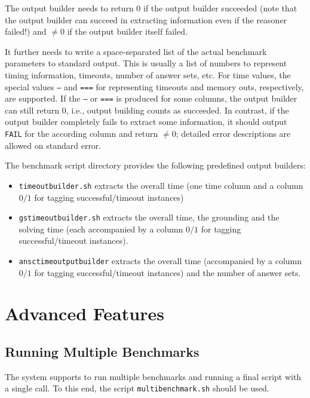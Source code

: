 \documentclass[a4paper]{article}
\begin{document}
		The output builder needs to return $0$ if the output builder succeeded (note that the output builder can succeed in extracting information even if the reasoner failed!)
		and $\not=0$ if the output builder itself failed.
		
		It further needs to write a space-separated list of the actual benchmark parameters to standard output.
		This is usually a list of numbers to represent timing information, timeouts, number of answer sets, etc. For time values,
		the special values {\tt ---} and {\tt ===} for representing timeouts and memory outs, respectively, are supported.
		If the {\tt ---} or {\tt ===} is produced for some columns, the output builder can still return $0$, i.e.,
		output building counts as succeeded.
		In contrast, if the output builder completely fails to extract some information, it should output {\tt FAIL} for the according column
		and return $\not=0$; detailed error descriptions are allowed on standard error.
		
		The benchmark script directory provides the following predefined output builders:
				
		\begin{itemize}
		    \item {\tt timeoutbuilder.sh} extracts the overall time (one time column and a column $0/1$ for tagging successful/timeout instances)
		    \item {\tt gstimeoutbuilder.sh} extracts the overall time, the grounding and the solving time (each accompanied by a column $0/1$ for tagging successful/timeout instances).
		    \item {\tt ansctimeoutputbuilder} extracts the overall time (accompanied by a column $0/1$ for tagging successful/timeout instances) and the number of answer sets.
		\end{itemize}
			
	\section{Advanced Features}
	\label{sec:advanced}
			
		\subsection{Running Multiple Benchmarks}
		\label{sec:advanced:multiple}
					
			The system supports to run multiple benchmarks and running a final script with a single call.
			To this end, the script {\tt multibenchmark.sh} should be used.
			
\end{document}
